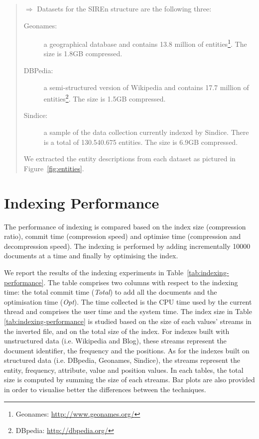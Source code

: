 \begin{quotation}
$\Longrightarrow$ Datasets for the SIREn structure are the following three:
\begin{description}
\item[Geonames:] a geographical database and contains 13.8 million of
entities\footnote{Geonames: \url{http://www.geonames.org/}}. The size is 1.8GB
compressed.
\item[DBPedia:] a semi-structured version of Wikipedia and contains 17.7
million of entities\footnote{DBpedia: \url{http://dbpedia.org/}}. The size is
1.5GB compressed.
\item[Sindice:] a sample of the data collection currently indexed by Sindice.
There is a total of 130.540.675 entities. The size is 6.9GB compressed.
\end{description}
We extracted the entity descriptions from each dataset as pictured in
Figure~\ref{fig:entities}.
\end{quotation}

\section{Indexing Performance}
\label{sec:compression:indexing-performance}

The performance of indexing is compared based on the index size (compression
ratio), commit time (compression speed) and optimise time (compression and
decompression speed). The indexing is performed by adding incrementally 10000
documents at a time and finally by optimising the index.

We report the results of the indexing experiments in
Table~\ref{tab:indexing-performance}. The table comprises two columns with
respect to the indexing time: the total commit time (\emph{Total}) to add all
the documents and the optimisation time (\emph{Opt}). The time collected is
the CPU time used by the current thread and comprises the user time and the
system time. The index size in Table \ref{tab:indexing-performance} is studied
based on the size of each values' streams in the inverted file, and on the total
size of the index. For indexes built with unstructured data (i.e. Wikipedia and
Blog), these streams represent the document identifier, the frequency and the
positions. As for the indexes built on structured data (i.e. DBpedia, Geonames,
Sindice), the streams represent the entity, frequency, attribute, value and
position values. In each tables, the total size is computed by summing the size
of each streams. Bar plots are also provided in order to visualise better the
differences between the techniques.

